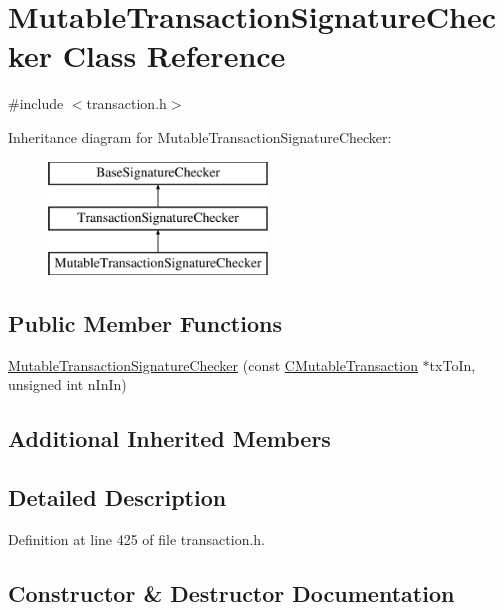 \hypertarget{class_mutable_transaction_signature_checker}{}\section{Mutable\+Transaction\+Signature\+Checker Class Reference}
\label{class_mutable_transaction_signature_checker}


{\ttfamily \#include $<$transaction.\+h$>$}

Inheritance diagram for Mutable\+Transaction\+Signature\+Checker\+:\begin{figure}[H]
\begin{center}
\leavevmode
\includegraphics[height=3.000000cm]{class_mutable_transaction_signature_checker}
\end{center}
\end{figure}
\subsection*{Public Member Functions}
\begin{DoxyCompactItemize}
\item 
\hyperlink{class_mutable_transaction_signature_checker_ac46799549e6eeebaff38cb1c9f5e1663}{Mutable\+Transaction\+Signature\+Checker} (const \hyperlink{struct_c_mutable_transaction}{C\+Mutable\+Transaction} $\ast$tx\+To\+In, unsigned int n\+In\+In)
\end{DoxyCompactItemize}
\subsection*{Additional Inherited Members}


\subsection{Detailed Description}


Definition at line 425 of file transaction.\+h.



\subsection{Constructor \& Destructor Documentation}
\hypertarget{class_mutable_transaction_signature_checker_ac46799549e6eeebaff38cb1c9f5e1663}{}
